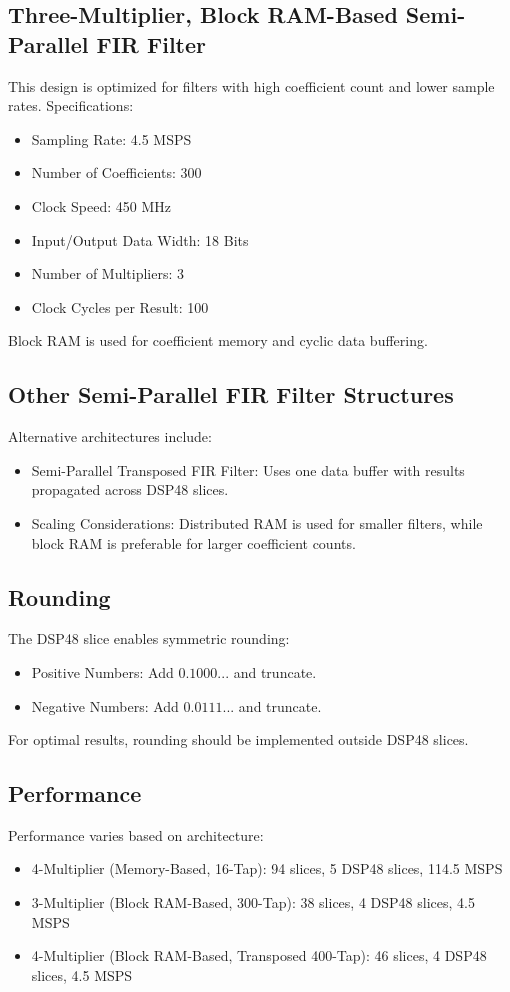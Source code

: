 \documentclass{article}
\begin{document}
	\subsection{Three-Multiplier, Block RAM-Based Semi-Parallel FIR Filter}
	This design is optimized for filters with high coefficient count and lower sample rates. Specifications:
	\begin{itemize}
		\item Sampling Rate: 4.5 MSPS
		\item Number of Coefficients: 300
		\item Clock Speed: 450 MHz
		\item Input/Output Data Width: 18 Bits
		\item Number of Multipliers: 3
		\item Clock Cycles per Result: 100
	\end{itemize}
	Block RAM is used for coefficient memory and cyclic data buffering.
	
	\subsection{Other Semi-Parallel FIR Filter Structures}
	Alternative architectures include:
	\begin{itemize}
		\item Semi-Parallel Transposed FIR Filter: Uses one data buffer with results propagated across DSP48 slices.
		\item Scaling Considerations: Distributed RAM is used for smaller filters, while block RAM is preferable for larger coefficient counts.
	\end{itemize}
	
	\subsection{Rounding}
	The DSP48 slice enables symmetric rounding:
	\begin{itemize}
		\item Positive Numbers: Add $0.1000...$ and truncate.
		\item Negative Numbers: Add $0.0111...$ and truncate.
	\end{itemize}
	For optimal results, rounding should be implemented outside DSP48 slices.
	
	\subsection{Performance}
	Performance varies based on architecture:
	\begin{itemize}
		\item 4-Multiplier (Memory-Based, 16-Tap): 94 slices, 5 DSP48 slices, 114.5 MSPS
		\item 3-Multiplier (Block RAM-Based, 300-Tap): 38 slices, 4 DSP48 slices, 4.5 MSPS
		\item 4-Multiplier (Block RAM-Based, Transposed 400-Tap): 46 slices, 4 DSP48 slices, 4.5 MSPS
	\end{itemize}
	
\end{document}
